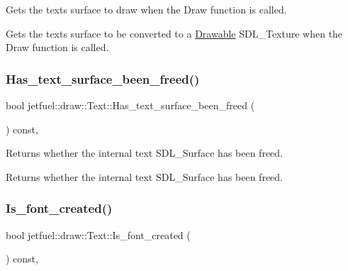 Gets the text\textquotesingle{}s surface to draw when the Draw function is called. 

Gets the text\textquotesingle{}s surface to be converted to a \hyperlink{classjetfuel_1_1draw_1_1Drawable}{Drawable} S\+D\+L\+\_\+\+Texture when the Draw function is called. \mbox{\label{classjetfuel_1_1draw_1_1Text_a0968c175395924bca3cc2e543adce3e9}} 
\subsubsection{\texorpdfstring{Has\+\_\+text\+\_\+surface\+\_\+been\+\_\+freed()}{Has\_text\_surface\_been\_freed()}}
{\footnotesize\ttfamily bool jetfuel\+::draw\+::\+Text\+::\+Has\+\_\+text\+\_\+surface\+\_\+been\+\_\+freed (\begin{DoxyParamCaption}{ }\end{DoxyParamCaption}) const\hspace{0.3cm}{\ttfamily [inline]}, {\ttfamily [protected]}}



Returns whether the internal text S\+D\+L\+\_\+\+Surface has been freed. 

Returns whether the internal text S\+D\+L\+\_\+\+Surface has been freed. \mbox{\label{classjetfuel_1_1draw_1_1Text_a179a3fb69ac28cba38a6fbfe541e175b}} 
\subsubsection{\texorpdfstring{Is\+\_\+font\+\_\+created()}{Is\_font\_created()}}
{\footnotesize\ttfamily bool jetfuel\+::draw\+::\+Text\+::\+Is\+\_\+font\+\_\+created (\begin{DoxyParamCaption}{ }\end{DoxyParamCaption}) const\hspace{0.3cm}{\ttfamily [inline]}, {\ttfamily [protected]}}



